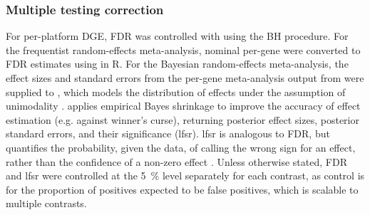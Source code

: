 \subsubsection{Multiple testing correction}
\label{subsubsec:hird_dge_multipleTestingCorrection}

%
For per-platform \gls{DGE}, \gls{FDR} was controlled with  using the \gls{BH} procedure.
For the frequentist random-effects meta-analysis, nominal per-gene \pvalues{} were converted to \gls{FDR} estimates using  in R.
%
For the Bayesian random-effects meta-analysis, 
the effect sizes and standard errors from the per-gene meta-analysis output from  were supplied to ,
which models the distribution of effects under the assumption of unimodality \autocite{stephens2016FalseDiscoveryRates}.
 applies empirical Bayes shrinkage to improve the accuracy of effect estimation (e.g. against winner's curse),
returning posterior effect sizes, posterior standard errors, and their significance (\gls{lfsr}).
\gls{lfsr} is analogous to \gls{FDR}, but quantifies the probability, given the data, of calling the wrong sign for an effect,
rather than the confidence of a non-zero effect \autocite{stephens2016FalseDiscoveryRates}.
Unless otherwise stated, \gls{FDR} and \gls{lfsr} were controlled at the \SI{5}{\percent} level separately for each contrast,
as control is for the proportion of positives expected to be false positives,
which is scalable to multiple contrasts.

